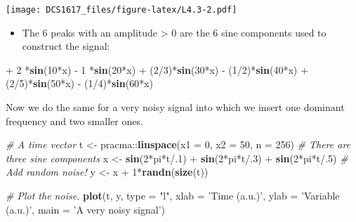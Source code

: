 \documentclass[]{book}
\newenvironment{Shaded}{\begin{snugshade}}{\end{snugshade}}
\newcommand{\KeywordTok}[1]{\textcolor[rgb]{0.13,0.29,0.53}{\textbf{{#1}}}}
\newcommand{\DataTypeTok}[1]{\textcolor[rgb]{0.13,0.29,0.53}{{#1}}}
\newcommand{\DecValTok}[1]{\textcolor[rgb]{0.00,0.00,0.81}{{#1}}}
\newcommand{\StringTok}[1]{\textcolor[rgb]{0.31,0.60,0.02}{{#1}}}
\newcommand{\CommentTok}[1]{\textcolor[rgb]{0.56,0.35,0.01}{\textit{{#1}}}}
\newcommand{\NormalTok}[1]{{#1}}
\providecommand{\tightlist}{%
  \setlength{\itemsep}{0pt}\setlength{\parskip}{0pt}}
\begin{document}
\texttt{[image: DCS1617\_files/figure-latex/L4.3-2.pdf]}

\begin{itemize}
\tightlist
\item
  The \(6\) peaks with an amplitude \textgreater{} \(0\) are the \(6\)
  sine components used to construct the signal:
\end{itemize}

\begin{Shaded}
\begin{Highlighting}[]
\NormalTok{+}\StringTok{   }\DecValTok{2}  \NormalTok{*}\KeywordTok{sin}\NormalTok{(}\DecValTok{10}\NormalTok{*x) }
\NormalTok{-}\StringTok{   }\DecValTok{1}  \NormalTok{*}\KeywordTok{sin}\NormalTok{(}\DecValTok{20}\NormalTok{*x) }
\NormalTok{+}\StringTok{ }\NormalTok{(}\DecValTok{2}\NormalTok{/}\DecValTok{3}\NormalTok{)*}\KeywordTok{sin}\NormalTok{(}\DecValTok{30}\NormalTok{*x) }
\NormalTok{-}\StringTok{ }\NormalTok{(}\DecValTok{1}\NormalTok{/}\DecValTok{2}\NormalTok{)*}\KeywordTok{sin}\NormalTok{(}\DecValTok{40}\NormalTok{*x) }
\NormalTok{+}\StringTok{ }\NormalTok{(}\DecValTok{2}\NormalTok{/}\DecValTok{5}\NormalTok{)*}\KeywordTok{sin}\NormalTok{(}\DecValTok{50}\NormalTok{*x) }
\NormalTok{-}\StringTok{ }\NormalTok{(}\DecValTok{1}\NormalTok{/}\DecValTok{4}\NormalTok{)*}\KeywordTok{sin}\NormalTok{(}\DecValTok{60}\NormalTok{*x)}
\end{Highlighting}
\end{Shaded}

Now we do the same for a very noisy signal into which we insert one
dominant frequency and two smaller ones.

\begin{Shaded}
\begin{Highlighting}[]
\CommentTok{# A time vector}
\NormalTok{t <-}\StringTok{ }\NormalTok{pracma::}\KeywordTok{linspace}\NormalTok{(}\DataTypeTok{x1 =} \DecValTok{0}\NormalTok{, }\DataTypeTok{x2 =} \DecValTok{50}\NormalTok{, }\DataTypeTok{n =} \DecValTok{256}\NormalTok{)}
\CommentTok{# There are three sine components}
\NormalTok{x <-}\StringTok{ }\KeywordTok{sin}\NormalTok{(}\DecValTok{2}\NormalTok{*pi*t/.}\DecValTok{1}\NormalTok{) +}\StringTok{ }\KeywordTok{sin}\NormalTok{(}\DecValTok{2}\NormalTok{*pi*t/.}\DecValTok{3}\NormalTok{) +}\StringTok{ }\KeywordTok{sin}\NormalTok{(}\DecValTok{2}\NormalTok{*pi*t/.}\DecValTok{5}\NormalTok{)}
\CommentTok{# Add random noise!}
\NormalTok{y <-}\StringTok{ }\NormalTok{x +}\StringTok{ }\DecValTok{1}\NormalTok{*}\KeywordTok{randn}\NormalTok{(}\KeywordTok{size}\NormalTok{(t))}

\CommentTok{# Plot the noise.}
\KeywordTok{plot}\NormalTok{(t, y, }\DataTypeTok{type =} \StringTok{"l"}\NormalTok{, }\DataTypeTok{xlab =} \StringTok{'Time (a.u.)'}\NormalTok{, }\DataTypeTok{ylab =} \StringTok{'Variable (a.u.)'}\NormalTok{, }\DataTypeTok{main =} \StringTok{'A very noisy signal'}\NormalTok{)}
\end{Highlighting}
\end{Shaded}
\end{document}

